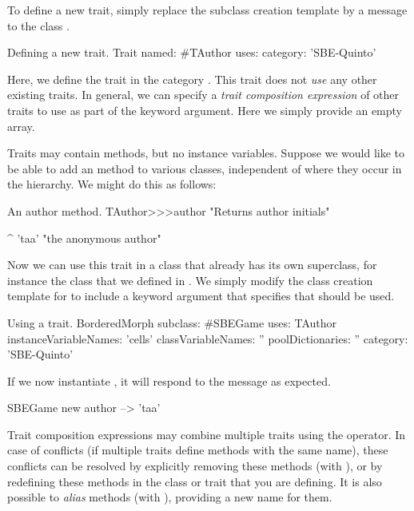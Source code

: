 \documentclass[a4paper,10pt,twoside]{book}
\begin{document}
To define a new trait, simply replace the subclass creation template by a message to the class .

\begin{classdef}[tauthor]{Defining a new trait.}
Trait named: #TAuthor
	uses: { }
	category: 'SBE-Quinto'
\end{classdef}

\noindent
Here, we define the trait  in the category .
This trait does not \emph{use} any other existing traits.
In general, we can specify a \emph{trait composition expression} of other traits to use as part of the  keyword argument.
Here we simply provide an empty array.

Traits may contain methods, but no instance variables.
Suppose we would like to be able to add an  method to various classes, independent of where they occur in the hierarchy.
We might do this as follows:

\begin{method}[author]{An author method.}
TAuthor>>>author
    "Returns author initials"

	^ 'taa'    "the anonymous author"
\end{method}

\noindent
Now we can use this trait in a class that already has its own superclass, for instance the  class that we defined in .
We simply modify the class creation template for  to include a  keyword argument that specifies that  should be used.

\begin{classdef}[sbegamewithtrait]{Using a trait.}
BorderedMorph subclass: #SBEGame
	uses: TAuthor
	instanceVariableNames: 'cells'
	classVariableNames: ''
	poolDictionaries: ''
	category: 'SBE-Quinto'
\end{classdef}

If we now instantiate , it will respond to the  message as expected.

\begin{code}{}
SBEGame new author --> 'taa'
\end{code}

Trait composition expressions may combine multiple traits using the \ct{+} operator.
In case of conflicts (\ie if multiple traits define methods with the same name), these conflicts can be resolved by explicitly removing these methods (with \ct{-}), or by redefining these methods in the class or trait that you are defining.
It is also possible to \emph{alias} methods (with ), providing a new name for them.
\end{document}
